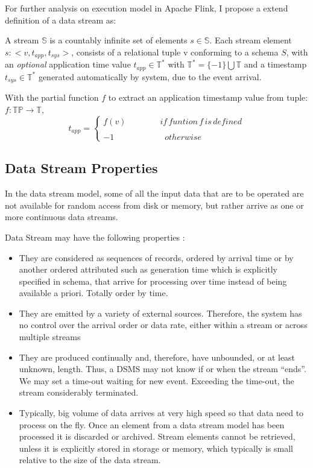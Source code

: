 For further analysis on execution model in Apache Flink, I propose a extend definition of a data stream as:
\begin{defi}
	A stream $\mathbb{S}$ is a countably infinite set of elements $s \in \mathbb{S}$. Each  stream element $s: <v, t_{app}, t_{sys}>$, consists of a relational tuple v conforming to a schema $S$, with an \textit{optional} application time value $t_{app} \in \mathbb{T}^*$ with $\mathbb{T}^* = \{-1\} \bigcup \mathbb{T}$ and a timestamp $t_{sys} \in \mathbb{T}^*$ generated automatically by system, due to the event arrival.
\end{defi}

With the partial function $f$ to extract an application timestamp value from tuple: $f: \mathbb{TP} \rightarrow \mathbb{T}$,
\begin{equation}
	t_{app} = 
	\begin{cases}
		f(v) \qquad\qquad if\,funtion\, f\, is\, defined\\
		   \\
		-1 \qquad\qquad\qquad otherwise
	\end{cases}
\end{equation}



 
\subsection*{Data Stream Properties} 
In the data stream model, some of all the input data that are to be operated are not available for random access from disk or memory, but rather arrive as one or more continuous data streams. 


Data Stream may have the following properties \citep{Golab:2010}:
\begin{itemize}
	\item They are considered as sequences of records, ordered by arrival time or by another ordered attributed such as generation time which is explicitly specified in schema, that arrive for processing over time instead of being available a priori. Totally order by time. 
	\item They are emitted by a variety of external sources. Therefore, the system has no control over the arrival order or data rate, either within a stream or across multiple streams
	\item They are produced continually and, therefore, have unbounded, or at least unknown, length. Thus, a DSMS may not know if or when the stream ``ends''. We may set a time-out waiting for new event. Exceeding the time-out, the stream considerably terminated. 
	\item Typically, big volume of data arrives at very high speed so that data need to process on the fly. Once an element from a data stream model has been processed it is discarded or archived. Stream elements cannot be retrieved, unless it is explicitly stored in storage or memory, which typically is small relative to the size of the data stream\citep{Babcock:2002}.
	
\end{itemize}


